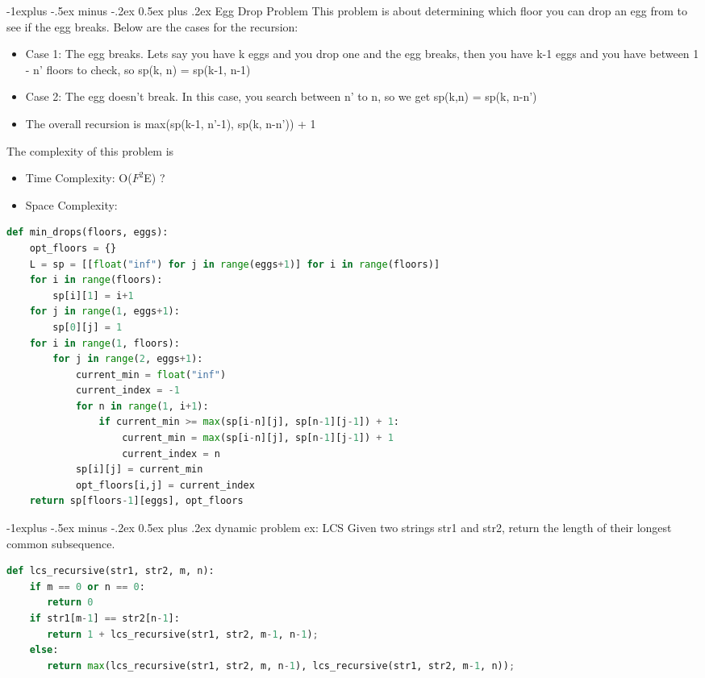 \documentclass[letterpaper, 8pt]{extarticle}
\makeatletter
\renewcommand{\subsection}{\@startsection{subsection}{2}{0mm}%
                                {-1explus -.5ex minus -.2ex}%
                                {0.5ex plus .2ex}%
                                {\normalfont\small\bfseries}}
\makeatother
\begin{document}
\begin{multicols*}{5}
\subsection{Egg Drop Problem}
This problem is about determining which floor you can drop an egg from to see if the egg breaks. Below are the cases for the recursion:
\begin{itemize}
    \item Case 1: The egg breaks. Lets say you have k eggs and you drop one and the egg breaks, then you have k-1 eggs and you have between 1 - n' floors to check, so sp(k, n) = sp(k-1, n-1)
    \item Case 2: The egg doesn't break. In this case, you search between n' to n, so we get sp(k,n) = sp(k, n-n')
    \item The overall recursion is max(sp(k-1, n'-1), sp(k, n-n')) + 1
\end{itemize}
The complexity of this problem is
\begin{itemize}
    \item Time Complexity: O($F^2$E) ?
    \item Space Complexity:
\end{itemize}
\begin{lstlisting}[language=Python]
def min_drops(floors, eggs):
    opt_floors = {}
    L = sp = [[float("inf") for j in range(eggs+1)] for i in range(floors)]
    for i in range(floors):
        sp[i][1] = i+1
    for j in range(1, eggs+1):
        sp[0][j] = 1
    for i in range(1, floors):
        for j in range(2, eggs+1):
            current_min = float("inf")
            current_index = -1
            for n in range(1, i+1):
                if current_min >= max(sp[i-n][j], sp[n-1][j-1]) + 1:
                    current_min = max(sp[i-n][j], sp[n-1][j-1]) + 1
                    current_index = n
            sp[i][j] = current_min
            opt_floors[i,j] = current_index
    return sp[floors-1][eggs], opt_floors
\end{lstlisting}
\subsection{dynamic problem ex: LCS}
Given two strings str1 and str2, return the length of their longest common subsequence.
\begin{lstlisting}[language=Python]
def lcs_recursive(str1, str2, m, n): 
    if m == 0 or n == 0: 
       return 0
    if str1[m-1] == str2[n-1]: 
       return 1 + lcs_recursive(str1, str2, m-1, n-1); 
    else: 
       return max(lcs_recursive(str1, str2, m, n-1), lcs_recursive(str1, str2, m-1, n));


\end{lstlisting}
\end{multicols*}
\end{document}
